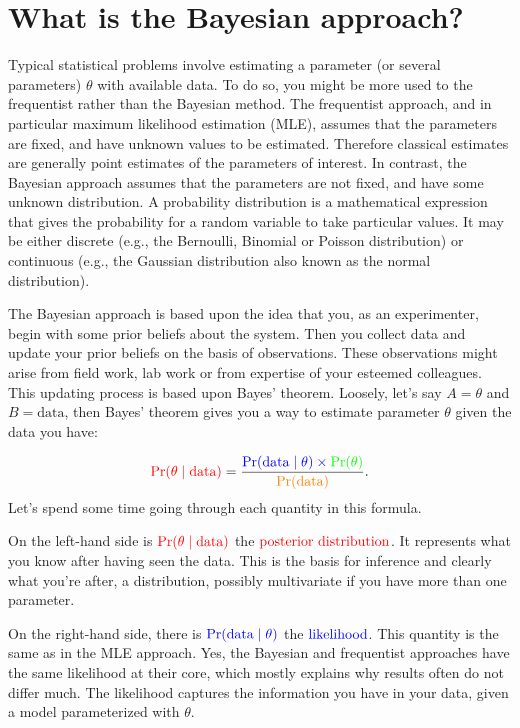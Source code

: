 \documentclass[
  12pt,
]{krantz}
\begin{document}
\section{What is the Bayesian approach?}\label{what-is-the-bayesian-approach}

Typical statistical problems involve estimating a parameter (or several parameters) \(\theta\) with available data. To do so, you might be more used to the frequentist rather than the Bayesian method. The frequentist approach, and in particular maximum likelihood estimation (MLE), assumes that the parameters are fixed, and have unknown values to be estimated. Therefore classical estimates are generally point estimates of the parameters of interest. In contrast, the Bayesian approach assumes that the parameters are not fixed, and have some unknown distribution. A probability distribution is a mathematical expression that gives the probability for a random variable to take particular values. It may be either discrete (e.g., the Bernoulli, Binomial or Poisson distribution) or continuous (e.g., the Gaussian distribution also known as the normal distribution).

The Bayesian approach is based upon the idea that you, as an experimenter, begin with some prior beliefs about the system. Then you collect data and update your prior beliefs on the basis of observations. These observations might arise from field work, lab work or from expertise of your esteemed colleagues. This updating process is based upon Bayes' theorem. Loosely, let's say \(A = \theta\) and \(B = \text{data}\), then Bayes' theorem gives you a way to estimate parameter \(\theta\) given the data you have:

\[{\color{red}{\Pr(\theta \mid \text{data})}} = \frac{\color{blue}{\Pr(\text{data} \mid \theta)} \times \color{green}{\Pr(\theta)}}{\color{orange}{\Pr(\text{data})}}.\]
Let's spend some time going through each quantity in this formula.

On the left-hand side is \(\color{red}{\Pr(\theta \mid \text{data})}\) the \(\color{red}{\text{posterior distribution}}\). It represents what you know after having seen the data. This is the basis for inference and clearly what you're after, a distribution, possibly multivariate if you have more than one parameter.

On the right-hand side, there is \(\color{blue}{\Pr(\text{data} \mid \theta)}\) the \(\color{blue}{\text{likelihood}}\). This quantity is the same as in the MLE approach. Yes, the Bayesian and frequentist approaches have the same likelihood at their core, which mostly explains why results often do not differ much. The likelihood captures the information you have in your data, given a model parameterized with \(\theta\).
\end{document}
